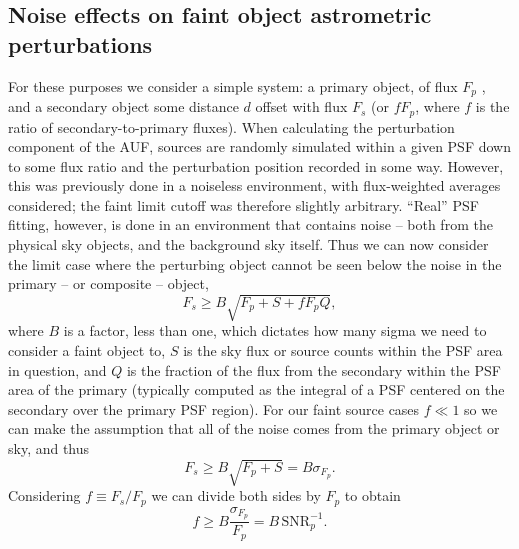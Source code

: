 \documentclass[fleqn,usenatbib]{mnras}
\begin{document}
\subsection{Noise effects on faint object astrometric perturbations}
For these purposes we consider a simple system: a primary object, of flux $F_p$ , and a secondary object some distance $d$ offset with flux $F_s$ (or $f F_p$, where $f$ is the ratio of secondary-to-primary fluxes). When calculating the perturbation component of the AUF, sources are randomly simulated within a given PSF down to some flux ratio and the perturbation position recorded in some way. However, this was previously done in a noiseless environment, with flux-weighted averages considered; the faint limit cutoff was therefore slightly arbitrary. ``Real'' PSF fitting, however, is done in an environment that contains noise -- both from the physical sky objects, and the background sky itself. Thus we can now consider the limit case where the perturbing object cannot be seen below the noise in the primary -- or composite -- object,
\begin{equation}
    F_s \geq B\sqrt{F_p + S + fF_pQ},
\end{equation}
where $B$ is a factor, less than one, which dictates how many sigma we need to consider a faint object to, $S$ is the sky flux or source counts within the PSF area in question, and $Q$ is the fraction of the flux from the secondary within the PSF area of the primary (typically computed as the integral of a PSF centered on the secondary over the primary PSF region). For our faint source cases $f \ll 1$ so we can make the assumption that all of the noise comes from the primary object or sky, and thus
\begin{equation}
    F_s \geq B\sqrt{F_p + S} = B\sigma_{F_p}.
\end{equation}
Considering $f \equiv F_s/F_p$ we can divide both sides by $F_p$ to obtain
\begin{equation}
    f \geq B\frac{\sigma_{F_p}}{F_p} = B\,\mathrm{SNR}_p^{-1}.
\end{equation}
\end{document}
